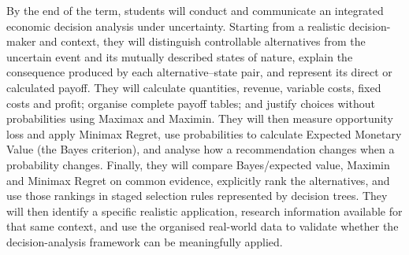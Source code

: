 \documentclass[10pt,letterpaper]{article}
\begin{document}
	\vspace{3pt}
	
	\begin{minipage}[t]{0.31\textwidth}
		\begin{bluebox}[valign=top]
			\fontsize{8.1}{10.3}\selectfont
			By the end of the term, students will conduct and communicate an integrated
			economic decision analysis under uncertainty. Starting from a realistic
			decision-maker and context, they will distinguish controllable alternatives
			from the uncertain event and its mutually described states of nature, explain
			the consequence produced by each alternative--state pair, and represent its
			direct or calculated payoff. They will calculate quantities, revenue, variable
			costs, fixed costs and profit; organise complete payoff tables; and justify
			choices without probabilities using Maximax and Maximin. They will then measure
			opportunity loss and apply Minimax Regret, use probabilities to calculate
			Expected Monetary Value (the Bayes criterion), and analyse how a recommendation
			changes when a probability changes. Finally, they will compare Bayes/expected
			value, Maximin and Minimax Regret on common evidence, explicitly rank the
			alternatives, and use those rankings in staged selection rules represented by
			decision trees. They will then identify a specific realistic application,
			research information available for that same context, and use the organised
			real-world data to validate whether the decision-analysis framework can be
			meaningfully applied.
		\end{bluebox}
	\end{minipage}%
	\hfill
\end{document}
